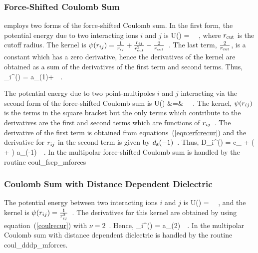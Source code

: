\subsubsection{Force-Shifted Coulomb Sum}
\D employs two forms of the force-shifted Coulomb sum.  In the first
form, the potential  energy due to two interacting ions $i$ and $j$ is
\beq
U(\rij) =  \Lihat \Ljhat {}~~,
\eeq
where $r_{\textrm{cut}}$ is the cutoff radius.  The kernel is
$\psi(r_{ij}) = \frac{1}{r_{ij}}+\frac{r_{ij}}{r_{\textrm{cut}}^2}-\frac{2}{r_{\textrm{cut}}}$~.
The last term, $\frac{2}{r_{\textrm{cut}}}$, is a constant which has a zero
derivative, hence the  derivatives of the kernel are obtained as
a sum of the derivatives of the first term and second terms.  Thus,
\beq
\bpart_i^{\bs}\psi(\rij) = a_{\bs}(1)+~~.
\eeq

The potential energy due to two point-multipoles $i$ and $j$ interacting
via the second form of the force-shifted Coulomb sum is
\bea
U(\rij) &=& \Lihat\Ljhat{}~~.
\eea
The kernel, $\psi(r_{ij})$ is the terms in the square bracket but the
only terms which contribute to the derivatives are the first and second
terms which are functions of $r_{ij}$~.  The derivative of the first term
is obtained from equations~(\ref{eqn:erfcrecur}) and the derivative
for $r_{ij}$ in the second term is given by $d_{\mathbf{s}}(-1)$~.  Thus,
\beq
D_i^{\bs}\psi(\rij) = c_{\bs} + \left( +
\frac{2\alpha}{\sqrt{\pi}}  \right) \cdot a_{\bs}(-1)~~.
\eeq
In \D the multipolar force-shifted Coulomb sum is handled by the routine {\sc coul\_fscp\_mforces}

\subsubsection{Coulomb Sum with Distance Dependent Dielectric}
The potential energy between two interacting ions $i$ and $j$ is
\beq
U(\rij) = \Lihat\Ljhat{}~~,
\eeq
and the kernel is $\psi(r_{ij}) = \frac{1}{r_{ij}^2}$~.  The derivatives for this
kernel are obtained by using equation~(\ref{coulrecur}) with $\nu = 2$~.  Hence,
\beq
\bpart_i^{\bs}\psi(\rij) = a_{\bs}(2)~~.
\eeq
In \D the multipolar Coulomb sum with distance dependent dielectric is handled by the routine {\sc coul\_dddp\_mforces}.

